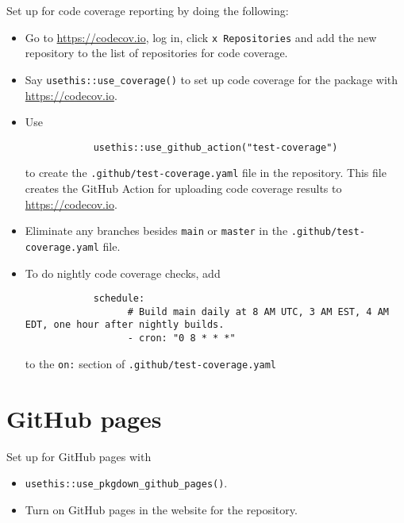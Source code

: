 \documentclass{article}
\begin{document}
Set up for code coverage reporting by doing the following:
%
\begin{itemize}

  \item Go to \url{https://codecov.io}, log in, click \verb|x Repositories| and add 
  		the new repository to the list of repositories for code coverage.
  
  \item Say \verb|usethis::use_coverage()| to set up code coverage 
		for the package with \url{https://codecov.io}.
  
  \item Use 
  		\begin{verbatim}
			usethis::use_github_action("test-coverage")
		\end{verbatim}
		to create the \verb|.github/test-coverage.yaml| file in the repository. 
		This file creates the GitHub Action for 
		uploading code coverage results to \url{https://codecov.io}.
		
  \item Eliminate any branches besides \texttt{main} or \texttt{master}
  		in the \verb|.github/test-coverage.yaml| file.
		
  \item To do nightly code coverage checks, add
  		\begin{verbatim}
			schedule:
				  # Build main daily at 8 AM UTC, 3 AM EST, 4 AM EDT, one hour after nightly builds.
				  - cron: "0 8 * * *"
  		\end{verbatim}
		to the \texttt{on:} section of \verb|.github/test-coverage.yaml|
		
\end{itemize}


\section{GitHub pages}
\label{sec:github_pages_setup}

Set up for GitHub pages with

%
\begin{itemize}

  \item \verb|usethis::use_pkgdown_github_pages()|.
  
  \item Turn on GitHub pages in the website for the repository.

\end{itemize}
\end{document}
